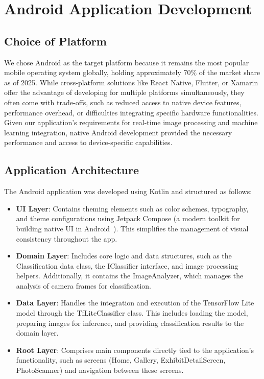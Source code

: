 \chapter{Android Application Development}

\section{Choice of Platform}

We chose Android as the target platform because it remains the most popular mobile operating system globally, holding approximately 70\% of the market share as of 2025. While cross-platform solutions like React Native, Flutter, or Xamarin offer the advantage of developing for multiple platforms simultaneously, they often come with trade-offs, such as reduced access to native device features, performance overhead, or difficulties integrating specific hardware functionalities. Given our application's requirements for real-time image processing and machine learning integration, native Android development provided the necessary performance and access to device-specific capabilities.

\section{Application Architecture}

The Android application was developed using Kotlin and structured as follows:

\begin{itemize}
\item \textbf{UI Layer}: Contains theming elements such as color schemes, typography, and theme configurations using Jetpack Compose (a modern toolkit for building native UI in Android~\cite{jetpack_compose}). This simplifies the management of visual consistency throughout the app.
\item \textbf{Domain Layer}: Includes core logic and data structures, such as the Classification data class, the IClassifier interface, and image processing helpers. Additionally, it contains the ImageAnalyzer, which manages the analysis of camera frames for classification.
\item \textbf{Data Layer}: Handles the integration and execution of the TensorFlow Lite model through the TfLiteClassifier class. This includes loading the model, preparing images for inference, and providing classification results to the domain layer.
\item \textbf{Root Layer}: Comprises main components directly tied to the application's functionality, such as screens (Home, Gallery, ExhibitDetailScreen, PhotoScanner) and navigation between these screens.
\end{itemize}

